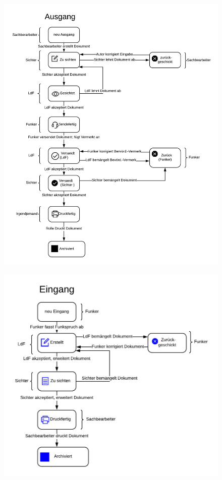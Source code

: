 \documentclass[a4paper,11pt,oneside, titlepage]{article}
\begin{document}
	\begin{figure}[htpb]

	\centering
	\includegraphics[width=0.8\linewidth]{HBausgang}
	\caption{}

	\end{figure}
	\newpage	
	\begin{figure}[htpb]
		\centering
		\includegraphics[width=0.8\linewidth]{HBeingang.png}
		\caption{}
	\end{figure}
	
\end{document}
